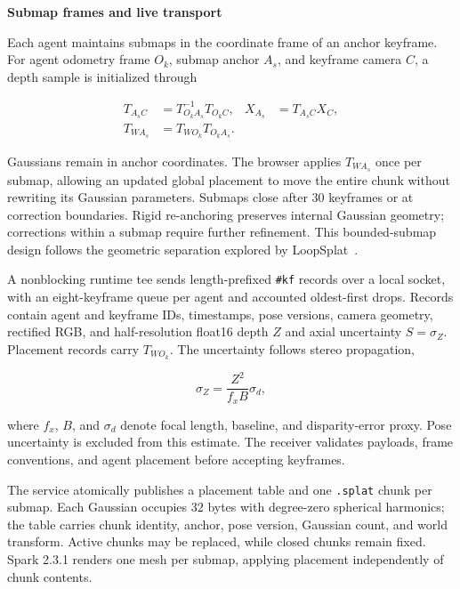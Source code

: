 \documentclass[10pt,a4paper]{article}
\newcommand{\indentedheading}[1]{\par\addvspace{0.65em}\noindent\hspace*{1em}\textbf{#1}\par\smallskip}
\begin{document}
\indentedheading{Submap frames and live transport}

Each agent maintains submaps in the coordinate frame of an anchor
keyframe. For agent odometry frame $O_k$, submap anchor $A_s$, and
keyframe camera $C$, a depth sample is initialized through

\begin{equation}
\begin{aligned}
T_{A_sC} &= T_{O_kA_s}^{-1}T_{O_kC},
& X_{A_s} &= T_{A_sC}X_C,\\
T_{WA_s} &= T_{WO_k}T_{O_kA_s}.
\end{aligned}
\label{eq:splat-frames}
\end{equation}

Gaussians remain in anchor coordinates. The browser applies
$T_{WA_s}$ once per submap, allowing an updated global placement
to move the entire chunk without rewriting its Gaussian parameters.
Submaps close after $30$ keyframes or at correction boundaries.
Rigid re-anchoring preserves internal Gaussian geometry; corrections
within a submap require further refinement. This bounded-submap
design follows the geometric separation explored by
LoopSplat~\cite{loopsplat}.

A nonblocking runtime tee sends length-prefixed
\texttt{\#kf} records over a local socket, with an eight-keyframe
queue per agent and accounted oldest-first drops. Records contain
agent and keyframe IDs, timestamps, pose versions, camera geometry,
rectified RGB, and half-resolution float16 depth $Z$ and axial
uncertainty $S=\sigma_Z$. Placement records carry $T_{WO_k}$.
The uncertainty follows stereo propagation,

\begin{equation}
    \sigma_Z=\frac{Z^2}{f_xB}\sigma_d,
    \label{eq:splat-depth-uncertainty}
\end{equation}

where $f_x$, $B$, and $\sigma_d$ denote focal length, baseline,
and disparity-error proxy. Pose uncertainty is excluded from
this estimate. The receiver validates payloads, frame conventions,
and agent placement before accepting keyframes.

The service atomically publishes a placement table and one
\texttt{.splat} chunk per submap. Each Gaussian occupies $32$
bytes with degree-zero spherical harmonics; the table carries
chunk identity, anchor, pose version, Gaussian count, and world
transform. Active chunks may be replaced, while closed chunks
remain fixed. Spark 2.3.1 renders one mesh per submap, applying
placement independently of chunk contents.
\end{document}
